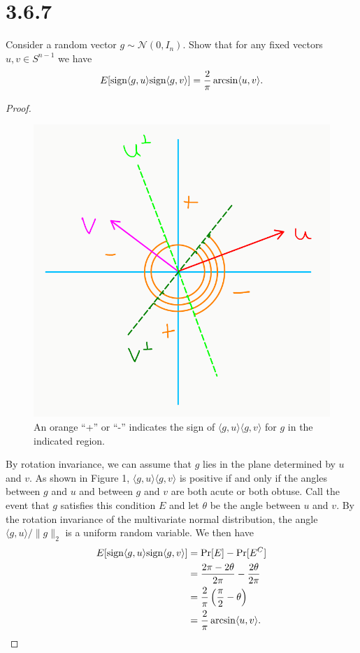 \documentclass[11pt,letterpaper]{report}
\newcommand{\mcal}[1]{\mathcal{#1}}
\begin{document}
\section*{3.6.7}
Consider a random vector $g\sim \mcal{N}(0, I_n)$. Show that for any fixed vectors $u, v\in S^{n-1}$ we have
\[
E[\text{sign}\langle g, u\rangle \text{sign} \langle g, v\rangle] = \frac{2}{\pi}\arcsin\langle u, v\rangle.
\]
\begin{proof}
	\begin{figure}\label{groth}
		\centering
			\includegraphics[scale=0.5]{groth.PNG}
			\caption{An orange ``+'' or ``-'' indicates the sign of $\langle g, u\rangle\langle g, v\rangle$ for $g$ in the indicated region.}
	\end{figure}
	By rotation invariance, we can assume that $g$ lies in the plane determined by $u$ and $v$. As shown in Figure 1, $\langle g, u\rangle\langle g, v\rangle$ is positive if and only if the angles between $g$ and $u$ and between $g$ and $v$ are both acute or both obtuse. Call the event that $g$ satisfies this condition $E$ and let $\theta$ be the angle between $u$ and $v$. By the rotation invariance of the multivariate normal distribution, the angle $\langle g, u\rangle/\|g\|_2$ is a uniform random variable. We then have
	\begin{align*}
		E[\text{sign}\langle g, u\rangle \text{sign} \langle g, v\rangle] &= \Pr[E] - \Pr[E^C]\\
		&= \frac{2\pi -2\theta}{2\pi} - \frac{2\theta}{2\pi}\\
		&= \frac{2}{\pi}\left(\frac{\pi}{2}-\theta\right)\\
		&= \frac{2}{\pi}\arcsin\langle u, v\rangle.
	\end{align*}
\end{proof}
\end{document}
